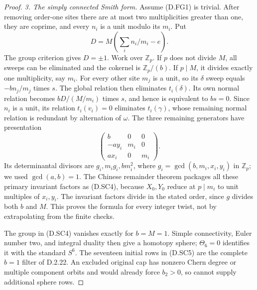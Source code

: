 \begin{proof}
\emph{3. The simply connected Smith form.}
Assume (D.FG1) is trivial. After removing order-one sites there are
at most two multiplicities greater than one, they are coprime, and
every $n_i$ is a unit modulo its $m_i$. Put
\[
                  D=M\left(\sum_i n_i/m_i-e\right).
\]
The group criterion gives $D=\pm1$. Work over $\mathbb Z_p$.
If $p$ does not divide $M$, all sweeps can be eliminated and the
cokernel is $\mathbb Z_p/(b)$. If $p\mid M$, it divides exactly
one multiplicity, say $m_i$. For every other site $m_j$ is a unit,
so its $\delta$ sweep equals $-bn_j/m_j$ times $s$. The global
relation then eliminates $t_i(\delta)$. Its own normal relation
becomes $bD/(M/m_i)$ times $s$, and hence is equivalent to $bs=0$.
Since $n_i$ is a unit, its relation $t_i(v_i)=0$ eliminates
$t_i(\gamma)$, whose remaining normal relation is redundant by
alternation of $\omega$. The three remaining generators have
presentation
\[
 \begin{pmatrix}
 b&0&0\\ -ay_i&m_i&0\\ ax_i&0&m_i
 \end{pmatrix}.                                             \tag{D.SC8}
\]
Its determinantal divisors are $g_i,m_i g_i,bm_i^2$, where
$g_i=\gcd(b,m_i,x_i,y_i)$ in $\mathbb Z_p$; we used
$\gcd(a,b)=1$. The Chinese remainder theorem packages all these
primary invariant factors as (D.SC4), because
$X_0,Y_0$ reduce at $p\mid m_i$ to unit multiples of $x_i,y_i$.
The invariant factors divide in the stated order, since $g$ divides
both $b$ and $M$. This proves the formula for every integer twist,
not by extrapolating from the finite checks.

The group in (D.SC4) vanishes exactly for $b=M=1$. Simple connectivity,
Euler number two, and integral duality then give a homotopy sphere;
$\Theta_6=0$ identifies it with the standard $S^6$. The seventeen
initial rows in (D.SC5) are the complete $b=1$ filter of D.2.22.
An excluded original cap has nonzero Chern degree or multiple
component orbits and would already force $b_2>0$, so cannot supply
additional sphere rows.


\end{proof}
